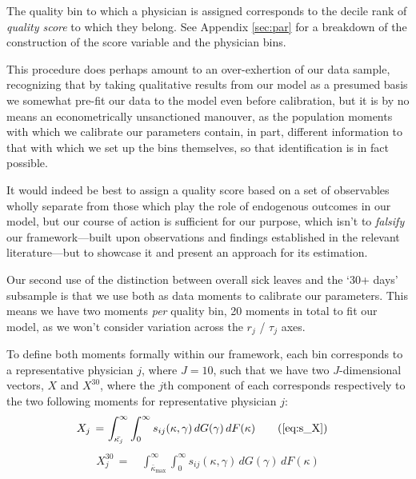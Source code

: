\documentclass[../main.tex]{subfiles}
\begin{document}
The quality bin to which a physician is assigned corresponds to the decile rank of \textit{quality score} to which they belong. See Appendix \ref{sec:par} for a breakdown of the construction of the score variable and the physician bins.

This procedure does perhaps amount to an over-exhertion of our data sample, recognizing that by taking qualitative results from our model as a presumed basis we somewhat pre-fit our data to the model even before calibration, but it is by no means an econometrically unsanctioned manouver, as the population moments with which we calibrate our parameters contain, in part, different information to that with which we set up the bins themselves, so that identification is in fact possible. 

It would indeed be best to assign a quality score based on a set of observables wholly separate from those which play the role of endogenous outcomes in our model, but our course of action is sufficient for our purpose, which isn't to \textit{falsify} our framework—built upon observations and findings established in the relevant literature—but to showcase it and present an approach for its estimation.

Our second use of the distinction between overall sick leaves and the `30+ days' subsample is that we use both as data moments to calibrate our parameters. This means we have two moments \textit{per} quality bin, 20 moments in total to fit our model, as we won't consider variation across the $r_j$ / $\tau_j$ axes.

To define both moments formally within our framework, each bin corresponds to a representative physician $j$, where $J = 10$, such that we have two $J$-dimensional vectors, $X$ and $X^{30}$, where the $j$th component of each corresponds respectively to the two following moments for representative physician $j$:
\begin{align}
    X_j \,=\, &  \int_{\bar{\kappa_j}}^{\infty} \int_{0}^{\infty}s_{ij}(\kappa, \gamma)  \,dG(\gamma) \,dF(\kappa) \tag{\ref{eq:s_X}}
\end{align}
\begin{align}
    X_j^{30} \,=\, & \int_{\bar{\kappa}_{\max}}^{\infty} \int_{0}^{\infty}s_{ij}(\kappa, \gamma)  \,dG(\gamma) \,dF(\kappa)
    \label{eq:X30}
\end{align}
\end{document}
